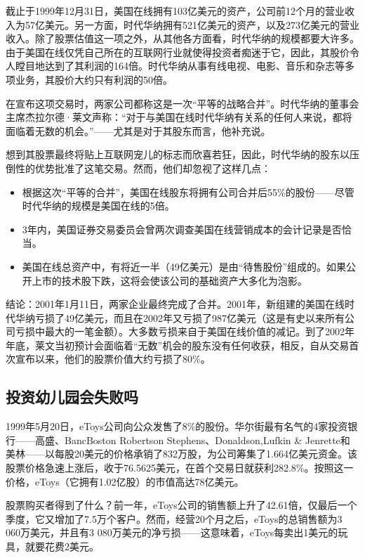 \documentclass[12pt,oneside]{book}
\begin{document}
截止于1999年12月31日，美国在线拥有103亿美元的资产，公司前12个月的营业收入为57亿美元。另一方面，时代华纳拥有521亿美元的资产，以及273亿美元的营业收入。除了股票估值这一项之外，从其他各方面看，时代华纳的规模都要大许多。由于美国在线仅凭自己所在的互联网行业就使得投资者痴迷于它，因此，其股价令人瞠目地达到了其利润的164倍。时代华纳从事有线电视、电影、音乐和杂志等多项业务，其股价大约只有利润的50倍。

在宣布这项交易时，两家公司都称这是一次“平等的战略合并”。时代华纳的董事会主席杰拉尔德·莱文声称：“对于与美国在线时代华纳有关系的任何人来说，都将面临着无数的机会。”——尤其是对于其股东而言，他补充说。

想到其股票最终将贴上互联网宠儿的标志而欣喜若狂，因此，时代华纳的股东以压倒性的优势批准了这笔交易。然而，他们却忽视了这样几点：

\begin{itemize}
\item 根据这次“平等的合并”，美国在线股东将拥有公司合并后55\%的股份——尽管时代华纳的规模是美国在线的5倍。
\item 3年内，美国证券交易委员会曾两次调查美国在线营销成本的会计记录是否恰当。
\item 美国在线总资产中，有将近一半（49亿美元）是由“待售股份”组成的。如果公开上市的技术股下跌，这将会使该公司的基础资产大多化为泡影。
\end{itemize}

结论：2001年1月11日，两家企业最终完成了合并。2001年，新组建的美国在线时代华纳亏损了49亿美元，而且在2002年又亏损了987亿美元（这是有史以来所有公司亏损中最大的一笔金额）。大多数亏损来自于美国在线价值的减记。到了2002年年底，莱文当初预计会面临着“无数”机会的股东没有任何收获，相反，自从交易首次宣布以来，他们的股票价值大约亏损了80\%。

\subsection{投资幼儿园会失败吗}
1999年5月20日，eToys公司向公众发售了8\%的股份。华尔街最有名气的4家投资银行——高盛、BancBoston Robertson Stephens、Donaldson,Lufkin \& Jenrette和美林——以每股20美元的价格承销了832万股，为公司筹集了1.664亿美元资金。该股票价格急速上涨后，收于76.5625美元，在首个交易日就获利282.8\%。按照这一价格，eToys（它拥有1.02亿股）的市值高达78亿美元。

股票购买者得到了什么？前一年，eToys公司的销售额上升了42.61倍，仅最后一个季度，它又增加了7.5万个客户。然而，经营20个月之后，eToys的总销售额为3 060万美元，并且有3 080万美元的净亏损——这意味着，eToys每卖出1美元的玩具，就要花费2美元。
\end{document}

